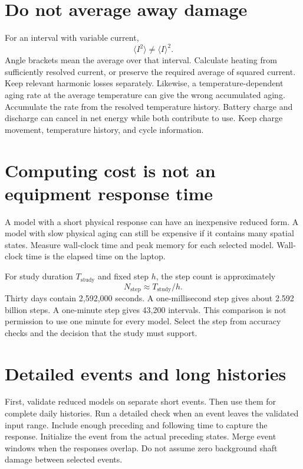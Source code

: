 \documentclass[11pt,a4paper]{report}
\begin{document}
\section{Do not average away damage}
For an interval with variable current,
\begin{equation}
\langle I^2\rangle\ne\langle I\rangle^2.
\label{eq:mean-square}
\end{equation}
Angle brackets mean the average over that interval.
Calculate heating from sufficiently resolved current, or preserve the required average of squared current.
Keep relevant harmonic losses separately.
Likewise, a temperature-dependent aging rate at the average temperature can give the wrong accumulated aging.
Accumulate the rate from the resolved temperature history.
Battery charge and discharge can cancel in net energy while both contribute to use.
Keep charge movement, temperature history, and cycle information.

\section{Computing cost is not an equipment response time}
A model with a short physical response can have an inexpensive reduced form.
A model with slow physical aging can still be expensive if it contains many spatial states.
Measure wall-clock time and peak memory for each selected model.
Wall-clock time is the elapsed time on the laptop.

For study duration $T_{\mathrm{study}}$ and fixed step $h$, the step count is approximately
\begin{equation}
N_{\mathrm{step}}\approx T_{\mathrm{study}}/h.
\end{equation}
Thirty days contain 2,592,000 seconds.
A one-millisecond step gives about 2.592 billion steps.
A one-minute step gives 43,200 intervals.
This comparison is not permission to use one minute for every model.
Select the step from accuracy checks and the decision that the study must support.

\section{Detailed events and long histories}
First, validate reduced models on separate short events.
Then use them for complete daily histories.
Run a detailed check when an event leaves the validated input range.
Include enough preceding and following time to capture the response.
Initialize the event from the actual preceding states.
Merge event windows when the responses overlap.
Do not assume zero background shaft damage between selected events.
\end{document}

